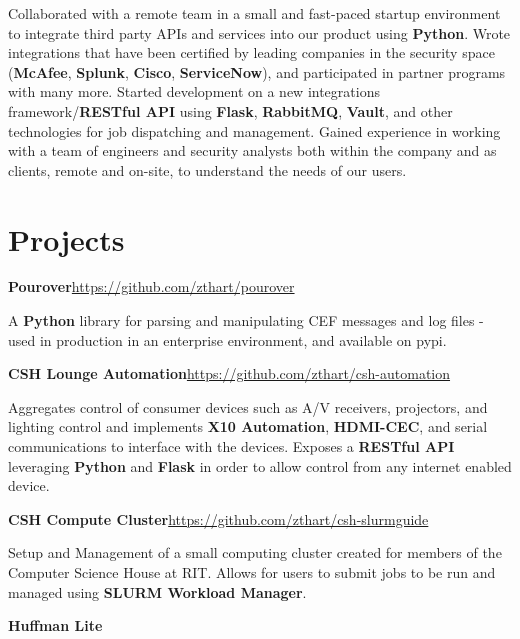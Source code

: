 \documentclass[margin,line]{resume}
\newcommand{\rurl}[1]{\hfill {\footnotesize \url{#1}}}
\begin{document}
\begin{resume}
\begin{asparablank}
        \small Collaborated with a remote team in a small and fast-paced startup environment to integrate third party APIs and services into our product using \textbf{Python}.
        \small Wrote integrations that have been certified by leading companies in the security space (\textbf{McAfee}, \textbf{Splunk}, \textbf{Cisco}, \textbf{ServiceNow}), and participated in partner programs with many more.
        \small Started development on a new integrations framework/\textbf{RESTful API} using \textbf{Flask}, \textbf{RabbitMQ}, \textbf{Vault}, and other technologies for job dispatching and management.
        \small Gained experience in working with a team of engineers and security analysts both within the company and as clients, remote and on-site, to understand the needs of our users.
	\end{asparablank}

\section{\mysidestyle Projects}
	\begin{asparablank}
		\item {\bf Pourover}\rurl{https://github.com/zthart/pourover}

		\small A \textbf{Python} library for parsing and manipulating CEF messages and log files - used in production in an enterprise environment, and available on pypi.
		\normalsize
		\\
		\item {\bf CSH Lounge Automation}\rurl{https://github.com/zthart/csh-automation}

		\small Aggregates control of consumer devices such as A/V receivers, projectors, and lighting control and
        implements \textbf{X10 Automation}, \textbf{HDMI-CEC}, and serial communications to interface with the devices.
        Exposes a \textbf{RESTful API} leveraging \textbf{Python} and \textbf{Flask} in order to allow control from any internet enabled device.
		\normalsize
        \\
		\item {\bf CSH Compute Cluster}\rurl{https://github.com/zthart/csh-slurmguide}

		\small Setup and Management of a small computing cluster created for members of the Computer Science House at RIT. Allows for users to submit jobs to be run and managed using \textbf{SLURM Workload Manager}.
		\\
		\item {\bf Huffman Lite}


\end{asparablank}
\end{resume}
\end{document}
